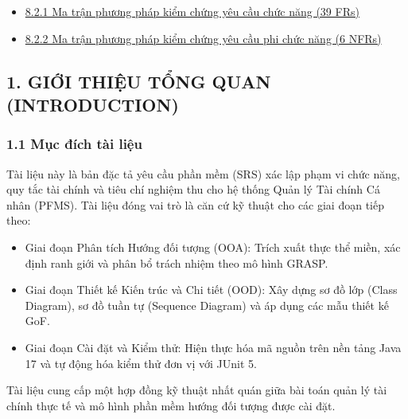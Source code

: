 \documentclass[11pt,a4paper]{article}
\providecommand{\tightlist}{
  \setlength{\itemsep}{0pt}\setlength{\parskip}{0pt}}
\begin{document}
\begin{itemize}
\begin{itemize}
    \begin{itemize}
    \tightlist
    \item
      \hyperref[821-ma-trux1eadn-phux1b0ux1a1ng-phuxe1p-kiux1ec3m-chux1ee9ng-yuxeau-cux1ea7u-chux1ee9c-nux103ng-39-frs]{8.2.1
      Ma trận phương pháp kiểm chứng yêu cầu chức năng (39 FRs)}
    \item
      \hyperref[822-ma-trux1eadn-phux1b0ux1a1ng-phuxe1p-kiux1ec3m-chux1ee9ng-yuxeau-cux1ea7u-phi-chux1ee9c-nux103ng-6-nfrs]{8.2.2
      Ma trận phương pháp kiểm chứng yêu cầu phi chức năng (6 NFRs)}
    \end{itemize}
  \end{itemize}
\end{itemize}

\endgroup

\clearpage
\subsection{1. GIỚI THIỆU TỔNG QUAN
(INTRODUCTION)}\label{1-giux1edbi-thiux1ec7u-tux1ed5ng-quan-introduction}

\subsubsection{1.1 Mục đích tài
liệu}\label{11-mux1ee5c-ux111uxedch-tuxe0i-liux1ec7u}

Tài liệu này là bản đặc tả yêu cầu phần mềm (SRS) xác lập phạm vi chức
năng, quy tắc tài chính và tiêu chí nghiệm thu cho hệ thống Quản lý Tài
chính Cá nhân (PFMS). Tài liệu đóng vai trò là căn cứ kỹ thuật cho các
giai đoạn tiếp theo:

\begin{itemize}
\tightlist
\item
  Giai đoạn Phân tích Hướng đối tượng (OOA): Trích xuất thực thể miền,
  xác định ranh giới và phân bổ trách nhiệm theo mô hình GRASP.
\item
  Giai đoạn Thiết kế Kiến trúc và Chi tiết (OOD): Xây dựng sơ đồ lớp
  (Class Diagram), sơ đồ tuần tự (Sequence Diagram) và áp dụng các mẫu
  thiết kế GoF.
\item
  Giai đoạn Cài đặt và Kiểm thử: Hiện thực hóa mã nguồn trên nền tảng
  Java 17 và tự động hóa kiểm thử đơn vị với JUnit 5.
\end{itemize}

Tài liệu cung cấp một hợp đồng kỹ thuật nhất quán giữa bài toán quản lý
tài chính thực tế và mô hình phần mềm hướng đối tượng được cài đặt.
\end{document}
